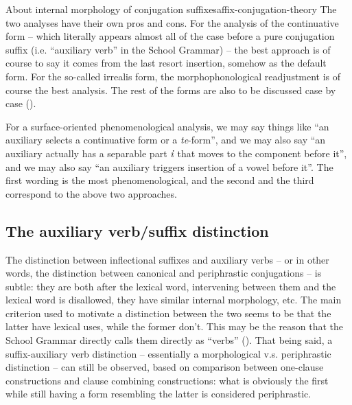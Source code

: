 \documentclass[UTF8, a4paper, oneside, scheme=plain]{ctexrep}
\newcommand{\corpus}[1]{\emph{#1}}
\begin{document}
\begin{theorybox}{About internal morphology of conjugation suffixes}{affix-conjugation-theory}
    The two analyses have their own pros and cons.
    For the analysis of the continuative form 
    -- which literally appears almost all of the case before a pure conjugation suffix
    (i.e. ``auxiliary verb'' in the School Grammar) -- 
    the best approach is of course to say 
    it comes from the last resort insertion, somehow as the default form.
    For the so-called irrealis form,
    the morphophonological readjustment is of course the best analysis.
    The rest of the forms are also to be discussed case by case ().

    For a surface-oriented phenomenological analysis,
    we may say things like ``an auxiliary selects a continuative form or a \corpus{te}-form'',
    and we may also say ``an auxiliary actually has a separable part $\corpus{i}$ 
    that moves to the component before it'',
    and we may also say ``an auxiliary triggers insertion of a vowel before it''.
    The first wording is the most phenomenological,
    and the second and the third correspond to the above two approaches.
\end{theorybox}

\subsection{The auxiliary verb/suffix distinction}\label{sec:auxliary-verb-suffix}

The distinction between inflectional suffixes and auxiliary verbs -- 
or in other words, the distinction between canonical and periphrastic conjugations -- 
is subtle: they are both after the lexical word,
intervening between them and the lexical word is disallowed, 
they have similar internal morphology, etc.
The main criterion used to motivate a distinction between the two 
seems to be that the latter have lexical uses, while the former don't.
This may be the reason that the School Grammar directly calls them directly as ``verbs'' 
().
That being said, a suffix-auxiliary verb distinction 
-- essentially a morphological v.s. periphrastic distinction -- 
can still be observed,
based on comparison between one-clause constructions 
and clause combining constructions:
what is obviously the first while still having a form resembling the latter is considered periphrastic.
\end{document}
